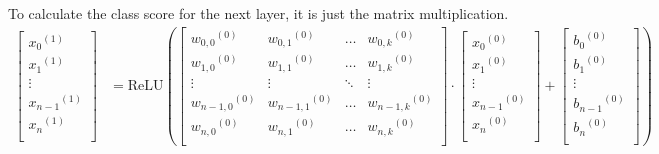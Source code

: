 \documentclass[12pt, a4paper]{article}
\begin{document}
                To calculate the class score for the next layer, it is just the matrix multiplication.
                \begin{align*}
                    \begin{bmatrix}
                        {{x}_{0}}^{(1)} \\
                        {{x}_{1}}^{(1)} \\
                        \vdots \\
                        {{x}_{n - 1}}^{(1)} \\
                        {{x}_{n}}^{(1)} \\
                    \end{bmatrix}
                    &=
                    \text{ReLU}
                    \left(
                    \begin{bmatrix}
                        {{w}_{0, 0}}^{(0)} & {{w}_{0, 1}}^{(0)} & \dots & {{w}_{0, k}}^{(0)} \\
                        {{w}_{1, 0}}^{(0)} & {{w}_{1, 1}}^{(0)} & \dots & {{w}_{1, k}}^{(0)} \\
                        \vdots & \vdots & \ddots & \vdots\\
                        {{w}_{n - 1, 0}}^{(0)} & {{w}_{n - 1, 1}}^{(0)} & \dots & {{w}_{n - 1, k}}^{(0)} \\
                        {{w}_{n, 0}}^{(0)} & {{w}_{n, 1}}^{(0)} & \dots & {{w}_{n, k}}^{(0)} \\
                    \end{bmatrix}
                    \cdot
                    \begin{bmatrix}
                        {{x}_{0}}^{(0)} \\
                        {{x}_{1}}^{(0)} \\
                        \vdots \\
                        {{x}_{n - 1}}^{(0)} \\
                        {{x}_{n}}^{(0)} \\
                    \end{bmatrix}
                    +
                    \begin{bmatrix}
                        {{b}_{0}}^{(0)} \\
                        {{b}_{1}}^{(0)} \\
                        \vdots \\
                        {{b}_{n - 1}}^{(0)} \\
                        {{b}_{n}}^{(0)} \\
                    \end{bmatrix}
                    \right)
                \end{align*}
\end{document}
